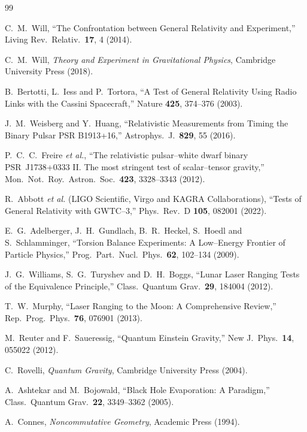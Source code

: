 \documentclass[11pt,a4paper]{article}
\begin{document}
\begin{thebibliography}{99}

C.~M.~Will,
``The Confrontation between General Relativity and Experiment,''
Living Rev.\ Relativ.\ \textbf{17}, 4 (2014).

C.~M.~Will,
\textit{Theory and Experiment in Gravitational Physics},
Cambridge University Press (2018).

B.~Bertotti, L.~Iess and P.~Tortora,
``A Test of General Relativity Using Radio Links with the Cassini Spacecraft,''
Nature \textbf{425}, 374--376 (2003).

J.~M.~Weisberg and Y.~Huang,
``Relativistic Measurements from Timing the Binary Pulsar PSR B1913+16,''
Astrophys.\ J.\ \textbf{829}, 55 (2016).

P.~C.~C.~Freire \textit{et al.},
``The relativistic pulsar--white dwarf binary PSR~J1738+0333 II. The most stringent test of scalar--tensor gravity,''
Mon.\ Not.\ Roy.\ Astron.\ Soc.\ \textbf{423}, 3328--3343 (2012).

R.~Abbott \textit{et al.} (LIGO Scientific, Virgo and KAGRA Collaborations),
``Tests of General Relativity with GWTC--3,''
Phys.\ Rev.\ D \textbf{105}, 082001 (2022).

E.~G.~Adelberger, J.~H.~Gundlach, B.~R.~Heckel, S.~Hoedl and S.~Schlamminger,
``Torsion Balance Experiments: A Low--Energy Frontier of Particle Physics,''
Prog.\ Part.\ Nucl.\ Phys.\ \textbf{62}, 102--134 (2009).

J.~G.~Williams, S.~G.~Turyshev and D.~H.~Boggs,
``Lunar Laser Ranging Tests of the Equivalence Principle,''
Class.\ Quantum Grav.\ \textbf{29}, 184004 (2012).

T.~W.~Murphy,
``Laser Ranging to the Moon: A Comprehensive Review,''
Rep.\ Prog.\ Phys.\ \textbf{76}, 076901 (2013).

M.~Reuter and F.~Saueressig,
``Quantum Einstein Gravity,''
New J.\ Phys.\ \textbf{14}, 055022 (2012).

C.~Rovelli,
\textit{Quantum Gravity},
Cambridge University Press (2004).

A.~Ashtekar and M.~Bojowald,
``Black Hole Evaporation: A Paradigm,''
Class.\ Quantum Grav.\ \textbf{22}, 3349--3362 (2005).

A.~Connes,
\textit{Noncommutative Geometry},
Academic Press (1994).


\end{thebibliography}
\end{document}
